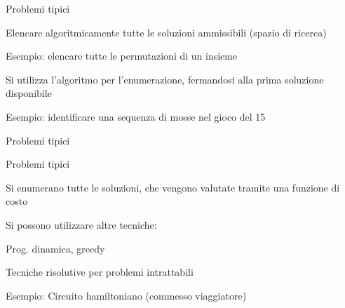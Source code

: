 \begin{frame}{Problemi tipici}

\vspace{-9pt}
\begin{myboxtitle}[Enumerazione]
\BIL
\item Elencare algoritmicamente tutte le soluzioni ammissibili (spazio di ricerca)
\item Esempio: elencare tutte le permutazioni di un insieme
\EIL
\end{myboxtitle}

\begin{myboxtitle}
\BIL
\item Si utilizza l'algoritmo per l'enumerazione, fermandosi alla prima soluzione 
disponibile
\item Esempio: identificare una sequenza di mosse nel gioco del 15
\EIL
\end{myboxtitle}

\end{frame}

\begin{frame}{Problemi tipici}

\vspace{-9pt}
\begin{myboxtitle}

\medskip
{}
\end{myboxtitle}

\end{frame}


\begin{frame}{Problemi tipici}

\vspace{-9pt}
\begin{myboxtitle}
\BIL
\item Si enumerano tutte le soluzioni, che vengono valutate tramite una
funzione di costo
\item Si possono utilizzare altre tecniche:
	\BI
	\item Prog. dinamica, greedy
	\item Tecniche risolutive per problemi intrattabili
	\EI
\item Esempio: Circuito hamiltoniano (commesso viaggiatore)
\EIL
\end{myboxtitle}


\end{frame}

